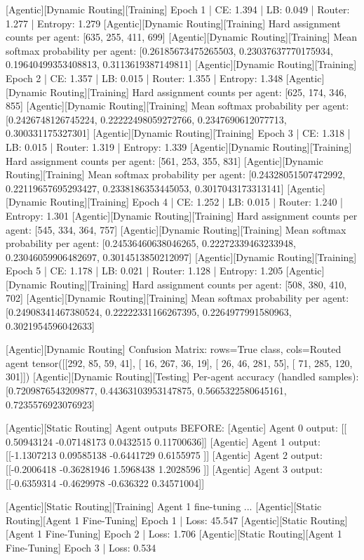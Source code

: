 [Agentic][Dynamic Routing][Training] Epoch 1 | CE: 1.394 | LB: 0.049 | Router: 1.277 | Entropy: 1.279
[Agentic][Dynamic Routing][Training] Hard assignment counts per agent: [635, 255, 411, 699]
[Agentic][Dynamic Routing][Training] Mean softmax probability per agent: [0.26185673475265503, 0.23037637770175934, 0.19640499353408813, 0.3113619387149811]
[Agentic][Dynamic Routing][Training] Epoch 2 | CE: 1.357 | LB: 0.015 | Router: 1.355 | Entropy: 1.348
[Agentic][Dynamic Routing][Training] Hard assignment counts per agent: [625, 174, 346, 855]
[Agentic][Dynamic Routing][Training] Mean softmax probability per agent: [0.2426748126745224, 0.22222498059272766, 0.2347690612077713, 0.300331175327301]
[Agentic][Dynamic Routing][Training] Epoch 3 | CE: 1.318 | LB: 0.015 | Router: 1.319 | Entropy: 1.339
[Agentic][Dynamic Routing][Training] Hard assignment counts per agent: [561, 253, 355, 831]
[Agentic][Dynamic Routing][Training] Mean softmax probability per agent: [0.24328051507472992, 0.22119657695293427, 0.2338186353445053, 0.3017043173313141]
[Agentic][Dynamic Routing][Training] Epoch 4 | CE: 1.252 | LB: 0.015 | Router: 1.240 | Entropy: 1.301
[Agentic][Dynamic Routing][Training] Hard assignment counts per agent: [545, 334, 364, 757]
[Agentic][Dynamic Routing][Training] Mean softmax probability per agent: [0.24536460638046265, 0.22272339463233948, 0.23046059906482697, 0.3014513850212097]
[Agentic][Dynamic Routing][Training] Epoch 5 | CE: 1.178 | LB: 0.021 | Router: 1.128 | Entropy: 1.205
[Agentic][Dynamic Routing][Training] Hard assignment counts per agent: [508, 380, 410, 702]
[Agentic][Dynamic Routing][Training] Mean softmax probability per agent: [0.24908341467380524, 0.22222331166267395, 0.2264977991580963, 0.3021954596042633]

[Agentic][Dynamic Routing] Confusion Matrix: rows=True class, cols=Routed agent
tensor([[292,  85,  59,  41],
[ 16, 267,  36,  19],
[ 26,  46, 281,  55],
[ 71, 285, 120, 301]])
[Agentic][Dynamic Routing][Testing] Per-agent accuracy (handled samples): [0.7209876543209877, 0.44363103953147875, 0.5665322580645161, 0.7235576923076923]

[Agentic][Static Routing] Agent outputs BEFORE:
[Agentic] Agent 0 output: [[ 0.50943124 -0.07148173  0.0432515   0.11700636]]
[Agentic] Agent 1 output: [[-1.1307213   0.09585138 -0.6441729   0.6155975 ]]
[Agentic] Agent 2 output: [[-0.2006418  -0.36281946  1.5968438   1.2028596 ]]
[Agentic] Agent 3 output: [[-0.6359314  -0.4629978  -0.636322    0.34571004]]

[Agentic][Static Routing][Training] Agent 1 fine-tuning ...
[Agentic][Static Routing][Agent 1 Fine-Tuning] Epoch 1 | Loss: 45.547
[Agentic][Static Routing][Agent 1 Fine-Tuning] Epoch 2 | Loss: 1.706
[Agentic][Static Routing][Agent 1 Fine-Tuning] Epoch 3 | Loss: 0.534

